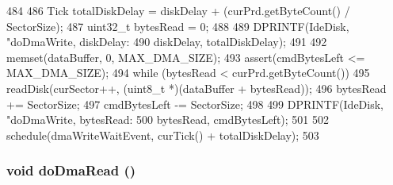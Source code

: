 \begin{DoxyCode}
484 {
486     Tick totalDiskDelay = diskDelay + (curPrd.getByteCount() / SectorSize);
487     uint32_t bytesRead = 0;
488 
489     DPRINTF(IdeDisk, "doDmaWrite, diskDelay: %
490             diskDelay, totalDiskDelay);
491 
492     memset(dataBuffer, 0, MAX_DMA_SIZE);
493     assert(cmdBytesLeft <= MAX_DMA_SIZE);
494     while (bytesRead < curPrd.getByteCount()) {
495         readDisk(curSector++, (uint8_t *)(dataBuffer + bytesRead));
496         bytesRead += SectorSize;
497         cmdBytesLeft -= SectorSize;
498     }
499     DPRINTF(IdeDisk, "doDmaWrite, bytesRead: %
500             bytesRead, cmdBytesLeft);
501 
502     schedule(dmaWriteWaitEvent, curTick() + totalDiskDelay);
503 }
\end{DoxyCode}
\hypertarget{classIdeDisk_a4349f9ce6cbcc189128ed2968e74e497}{
\subsubsection[{doDmaRead}]{\setlength{\rightskip}{0pt plus 5cm}void doDmaRead ()}}
\label{classIdeDisk_a4349f9ce6cbcc189128ed2968e74e497}



